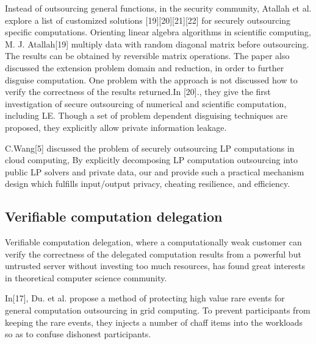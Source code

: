 \documentclass[runningheads,a4paper]{llncs}
\begin{document}
Instead of outsourcing general functions, in the security community, Atallah et al. explore a list of customized solutions [19][20][21][22] for securely outsourcing specific computations. Orienting linear algebra algorithms in scientific computing, M. J. Atallah[19] multiply data with random diagonal matrix before outsourcing. The results can be obtained by reversible matrix operations. The paper also discussed the extension problem domain and reduction, in order to further disguise computation. One problem with the approach is not discussed how to verify the correctness of the results returned.In [20]., they give the first investigation of secure outsourcing of numerical and scientific computation, including LE. Though a set of problem dependent disguising techniques are proposed, they explicitly allow private information leakage.

C.Wang[5] discussed the problem of securely outsourcing LP computations in cloud computing, By explicitly decomposing LP computation outsourcing into public LP solvers and private data, our 
and provide such a practical mechanism design which fulfills input/output privacy, cheating resilience, and efficiency.

% 
\subsection{Verifiable computation delegation}

Verifiable computation delegation, where a computationally weak customer can verify the correctness of the delegated computation results from a powerful but untrusted server without investing too much resources, has found great interests in theoretical computer science community.

In[17], Du. et al. propose a method of protecting high value rare events for general computation outsourcing in grid computing. To prevent participants from keeping the rare events, they injects a number of chaff items into the workloads so as to confuse dishonest participants.
\end{document}
